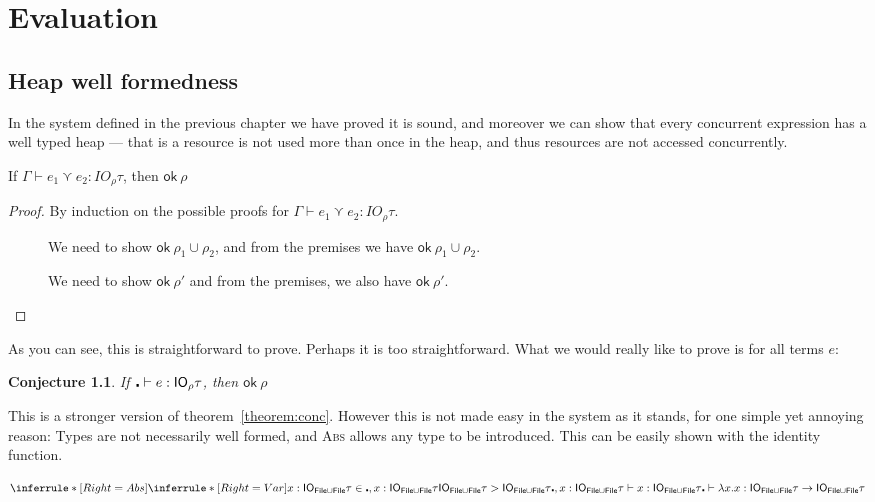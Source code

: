 \chapter{Evaluation}\label{cha:evaluation}
\section{Heap well formedness}
In the system defined in the previous chapter we have proved it is
sound, and moreover we can show that every concurrent expression has a
well typed heap --- that is a resource is not used more than once in the
heap, and thus resources are not accessed concurrently.

\begin{theorem}
  If $\Gamma \vdash e_1 \curlyvee e_2 : IO_\rho \tau$, then $\textsf{ok} \ \rho$
  \label{theorem:conc}
\end{theorem}
\begin{proof}
  By induction on the possible proofs for $\Gamma \vdash e_1 \curlyvee e_2 : IO_\rho \tau$.
  \begin{description}
  \item[\textmd{}]
    We need to show $\textsf{ok} \ \rho_1 \cup \rho_2$, and from the premises we have $\textsf{ok} \ \rho_1 \cup \rho_2$.
  \item[\textmd{}]
    We need to show $\textsf{ok} \ \rho'$ and from the premises, we also have $\textsf{ok} \ \rho'$. 
  \end{description}
\end{proof}
As you can see, this is straightforward to prove. Perhaps it is too
straightforward. What we would really like to prove is for all terms
$e$:
\newtheorem{conjecture}{Conjecture}
\begin{conjecture}
  If $\centerdot \vdash e : \mathsf{IO}_\rho \tau$, then $\textsf{ok} \ \rho$
  \label{conjecture:strongconc}
\end{conjecture}
This is a stronger version of theorem~\ref{theorem:conc}. However this
is not made easy in the system as it stands, for one simple yet
annoying reason: Types are not necessarily well formed, and
\textsc{Abs} allows any type to be introduced. This can be easily
shown with the identity function.

$$\inferrule*[Right=Abs]{
  \inferrule*[Right=Var]{x : \IO_{\textsf{File} \cup \textsf{File}} \tau  \in
    \centerdot , x : \IO_{\textsf{File} \cup \textsf{File}} \tau \\  \IO_{\textsf{File} \cup \textsf{File}} \tau >
    \IO_{\textsf{File} \cup \textsf{File}} \tau }{\centerdot , x : \IO_{\textsf{File} \cup
      \textsf{File}} \tau \vdash x : \IO_{\textsf{File} \cup \textsf{File}} \tau}
}
{\centerdot \vdash \lambda x . x : \IO_{\textsf{File} \cup \textsf{File}} \tau \rightarrow \IO_{\textsf{File} \cup \textsf{File}} \tau}
$$


